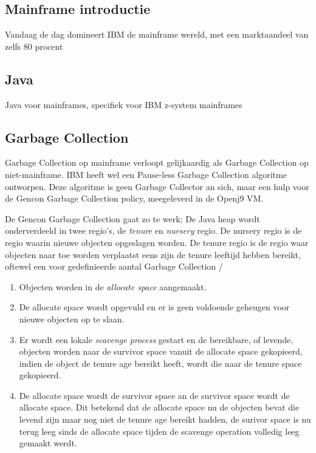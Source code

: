 \subsection{Mainframe introductie}
\label{sec:mainframe introductie}

Vandaag de dag domineert IBM de mainframe wereld, met een marktaandeel van zelfs 80 procent %

\subsection{Java}
\label{sec:mainframe java}
Java voor mainframes, specifiek voor IBM z-system mainframes %


\subsection{Garbage Collection}
\label{sec:mainframe garbage collection}
Garbage Collection op mainframe verloopt gelijkaardig als Garbage Collection op niet-mainframe.
IBM heeft wel een Pause-less Garbage Collection algoritme ontworpen.
Deze algoritme is geen Garbage Collector an sich, maar een hulp voor de Gencon Garbage Collection policy, meegeleverd in de Openj9 VM.

De Gencon Garbage Collection gaat zo te werk;
De Java heap wordt onderverdeeld in twee regio's, de \textit{tenure} en \textit{nursery} regio.
De nursery regio is de regio waarin nieuwe objecten opgeslagen worden.
De tenure regio is de regio waar objecten naar toe worden verplaatst eens zijn de tenure leeftijd hebben bereikt, oftewel een voor gedefinieerde aantal Garbage Collection /%

\begin{enumerate}
    \item Objecten worden in de \textit{allocate space} aangemaakt.
    \item De allocate space wordt opgevuld en er is geen voldoende geheugen voor nieuwe objecten op te slaan.
    \item Er wordt een lokale \textit{scavenge process} gestart en de bereikbare, of levende, objecten worden naar de survivor space vanuit de allocate space gekopieerd, indien de object de tenure age bereikt heeft, wordt die naar de tenure space gekopieerd.
    \item De allocate space wordt de survivor space an de survivor space wordt de allocate space.
     Dit betekend dat de allocate space nu de objecten bevat die levend zijn maar nog niet de tenure age bereikt hadden,
     de surivor space is nu terug leeg sinds de allocate space tijden de scavenge operation volledig leeg gemaakt werdt. %
\end{enumerate}

